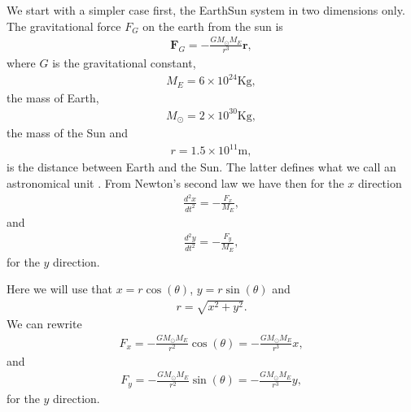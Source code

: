 \documentclass[letterpaper,10pt,english]{sphinxmanual}
\begin{document}
We start with a simpler case first, the Earth\sphinxhyphen{}Sun system  in two dimensions only.  The gravitational force \(F_G\) on the earth from the sun is
\begin{equation*}
\begin{split}
\boldsymbol{F}_G=-\frac{GM_{\odot}M_E}{r^3}\boldsymbol{r},
\end{split}
\end{equation*}
where \(G\) is the gravitational constant,
\begin{equation*}
\begin{split}
M_E=6\times 10^{24}\mathrm{Kg},
\end{split}
\end{equation*}
the mass of Earth,
\begin{equation*}
\begin{split}
M_{\odot}=2\times 10^{30}\mathrm{Kg},
\end{split}
\end{equation*}
the mass of the Sun and
\begin{equation*}
\begin{split}
r=1.5\times 10^{11}\mathrm{m},
\end{split}
\end{equation*}
is the distance between Earth and the Sun. The latter defines what we call an astronomical unit .
From Newton’s second law we have then for the \(x\) direction
\begin{equation*}
\begin{split}
\frac{d^2x}{dt^2}=-\frac{F_{x}}{M_E},
\end{split}
\end{equation*}
and
\begin{equation*}
\begin{split}
\frac{d^2y}{dt^2}=-\frac{F_{y}}{M_E},
\end{split}
\end{equation*}
for the \(y\) direction.

Here we will use  that  \(x=r\cos{(\theta)}\), \(y=r\sin{(\theta)}\) and
\begin{equation*}
\begin{split}
r = \sqrt{x^2+y^2}.
\end{split}
\end{equation*}
We can rewrite
\begin{equation*}
\begin{split}
F_{x}=-\frac{GM_{\odot}M_E}{r^2}\cos{(\theta)}=-\frac{GM_{\odot}M_E}{r^3}x,
\end{split}
\end{equation*}
and
\begin{equation*}
\begin{split}
F_{y}=-\frac{GM_{\odot}M_E}{r^2}\sin{(\theta)}=-\frac{GM_{\odot}M_E}{r^3}y,
\end{split}
\end{equation*}
for the \(y\) direction.
\end{document}
